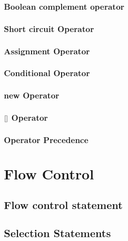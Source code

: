 \documentclass[14pt,fleqn]{extbook} %
\newcommand{\s} {
	\hphantom{} \hphantom{} \hphantom{}
}
\begin{document}
\subsection{Boolean complement operator}

\subsection{Short circuit Operator}

\subsection{Assignment Operator}

\subsection{Conditional Operator}

%
\subsection{new Operator}

\subsection{ $\left[ \s \right]$ Operator}

\subsection{Operator Precedence}


\chapter{Flow Control}
\section{Flow control statement}

\section{Selection Statements}

\end{document}
